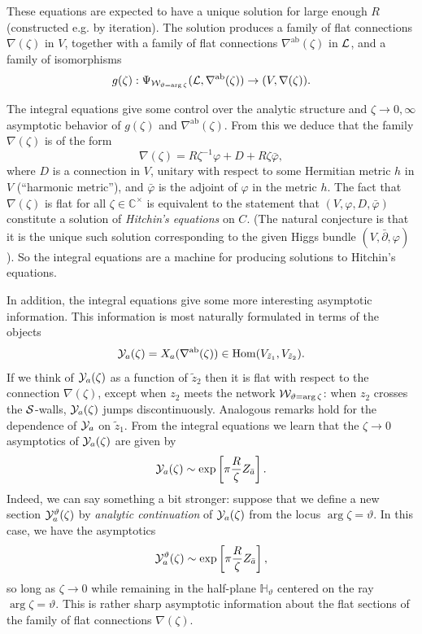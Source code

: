 \documentclass[11pt,a4paper]{article}
\def\IC{\mathbb{C}}
\def\CL {{\cal L}}
\def\wnet {{\cal W}}
\def\cY {{\cal Y}}
\def\CS {{\cal S}}
\def\ab{{\mathrm{ab}}}
\def\tz{{\tilde z}}
\newcommand{\ti}[1]{\textit{#1}}
\def\IC{\mathbb{C}}
\def\CL {{\cal L}}
\def\wnet {{\cal W}}
\def\CS {{\cal S}}
\DeclareMathOperator{\Hom}{{Hom}}
\begin{document}
These equations are expected to have a unique solution for large enough $R$ (constructed e.g. by iteration).
The solution produces a family of flat connections $\nabla(\zeta)$ in $V$,
together with a family of flat connections $\nabla^\ab(\zeta)$ in $\CL$,
and a family of isomorphisms
\begin{equation}
g(\zeta): \Psi_{\wnet_{\vartheta = \arg \zeta}}(\CL, \nabla^\ab(\zeta)) \to (V, \nabla(\zeta)).
\end{equation}

The integral equations give some control over the analytic structure
and $\zeta \to 0,\infty$ asymptotic behavior of $g(\zeta)$ and $\nabla^{\ab}(\zeta)$.
From this we deduce that the family $\nabla(\zeta)$ is of the form
\begin{equation} \label{eq:hitchin-connection}
 \nabla(\zeta) = R \zeta^{-1} \varphi + D + R \zeta \bar\varphi,
\end{equation}
where $D$ is a connection in $V$, unitary with respect to some Hermitian metric $h$ in $V$ (``harmonic metric''),
and $\bar\varphi$ is the adjoint of $\varphi$ in the metric $h$.
The fact that $\nabla(\zeta)$ is flat for all $\zeta \in \IC^\times$ is equivalent to the statement
that $(V, \varphi, D, \bar\varphi)$
constitute a solution of \ti{Hitchin's equations} on $C$.  (The natural conjecture is that it is the unique
such solution corresponding to the given Higgs bundle $(V, \bar\partial, \varphi)$).
So the integral equations are a machine for producing solutions to Hitchin's equations.

In addition, the integral equations give some more interesting asymptotic information.
This information is most naturally formulated in terms of the objects
\begin{equation}
\cY_a(\zeta) = X_a(\nabla^\ab(\zeta)) \in \Hom(V_{\tz_1}, V_{\tz_2}).
\end{equation}
If we think of $\cY_a(\zeta)$ as a function of $\tz_2$ then it is flat with respect to the connection
$\nabla(\zeta)$, except when $z_2$ meets the network $\wnet_{\vartheta = \arg \zeta}$:  when $z_2$
crosses the $\CS$-walls, $\cY_a(\zeta)$ jumps discontinuously.  Analogous remarks
hold for the dependence of $\cY_a$ on $\tz_1$.
From the integral equations we learn that
the $\zeta \to 0$ asymptotics of $\cY_a(\zeta)$ are given by
\begin{equation}
 \cY_a(\zeta) \sim \exp \left[ \pi \frac{R}{\zeta} Z_{\bar a} \right].
\end{equation}
Indeed, we can say something a bit stronger:
suppose that we define a new section $\cY_a^\vartheta(\zeta)$ by
\ti{analytic continuation} of $\cY_a(\zeta)$ from the
locus $\arg \zeta = \vartheta$.  In this case, we have the asymptotics
\begin{equation} \label{eq:ya-halfplane}
\cY_a^\vartheta(\zeta) \sim \exp \left[ \pi \frac{R}{\zeta} Z_{\bar a} \right],
\end{equation}
so long as $\zeta \to 0$ while remaining in the half-plane ${\mathbb H}_\vartheta$ centered on the ray $\arg \zeta = \vartheta$.
This is rather sharp asymptotic information about the flat sections of the family of flat connections
$\nabla(\zeta)$.
\end{document}

